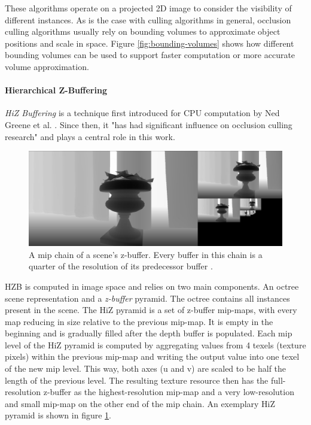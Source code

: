 \noindent
These algorithms operate on a projected 2D image to consider the visibility of different instances. As is the case 
with culling algorithms in general, occlusion culling algorithms usually rely on bounding volumes to approximate 
object positions and scale in space. Figure \ref{fig:bounding-volumes} shows how different bounding volumes can be 
used to support faster computation or more accurate volume approximation.


\paragraph*{Hierarchical Z-Buffering} \label{subsubsec-hierarchical-z-buffering}

\emph{\ac{HiZ} Buffering} is a technique first introduced for \ac{CPU} computation by Ned Greene et al. 
\cite{Greene93,Greene95}. Since then, it "has had significant influence on occlusion culling research" 
\cite{AkenineMoeller2018} and plays a central role in this work. \\

\begin{figure}[h]
    \centering
    \includegraphics[width=\linewidth]{images/graphics/hiz-mip-chain.jpg}
    \caption{A mip chain of a scene's z-buffer. Every buffer in this chain is a quarter of the resolution of its 
    predecessor buffer \cite{Schachtschabel2017}.}
    \label{fig:hiz-mip-chain}
\end{figure}

\noindent
\ac{HZB} is computed in image space and relies on two main components. An octree scene representation and a 
\emph{z-buffer} pyramid. The octree contains all instances present in the scene. The \ac{HiZ} pyramid is a set of 
z-buffer mip-maps, with every map reducing in size relative to the previous mip-map. It is empty in the beginning 
and is gradually filled after the depth buffer is populated. Each mip level of the \ac{HiZ} pyramid is computed by 
aggregating values from 4 texels (texture pixels) within the previous mip-map and writing the output value into one 
texel of the new mip level. This way, both axes (u and v) are scaled to be half the length of the previous level. 
The resulting texture resource then has the full-resolution z-buffer as the highest-resolution mip-map and a very 
low-resolution and small mip-map on the other end of the mip chain. An exemplary \ac{HiZ} pyramid is shown in figure 
\ref{fig:hiz-mip-chain}.\\

